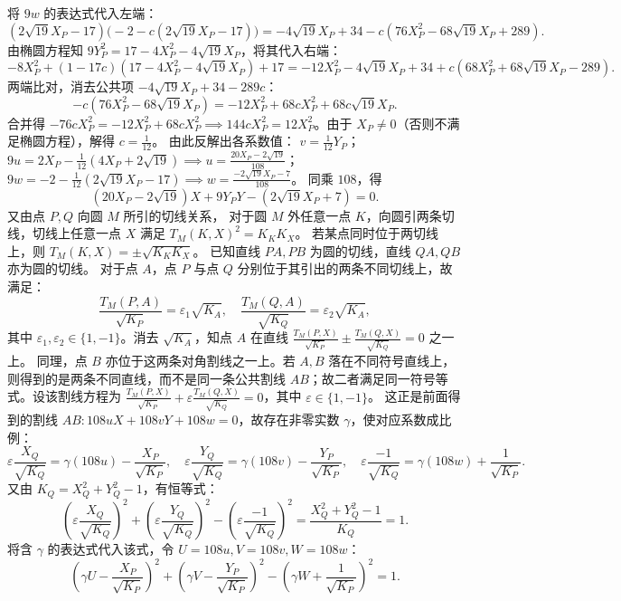 \begin{solution}
将 $9w$ 的表达式代入左端：
\[ (2\sqrt{19} X_P - 17)\big(-2 - c(2\sqrt{19} X_P - 17)\big) = -4\sqrt{19} X_P + 34 - c(76 X_P^2 - 68\sqrt{19} X_P + 289). \]
由椭圆方程知 $9Y_P^2 = 17 - 4X_P^2 - 4\sqrt{19} X_P$，将其代入右端：
\[ -8X_P^2 + (1 - 17c)(17 - 4X_P^2 - 4\sqrt{19} X_P) + 17 = -12X_P^2 - 4\sqrt{19} X_P + 34 + c(68X_P^2 + 68\sqrt{19} X_P - 289). \]
两端比对，消去公共项 $-4\sqrt{19} X_P + 34 - 289c$：
\[ -c(76 X_P^2 - 68\sqrt{19} X_P) = -12X_P^2 + 68c X_P^2 + 68c \sqrt{19} X_P. \]
合并得 $-76c X_P^2 = -12X_P^2 + 68c X_P^2 \implies 144c X_P^2 = 12X_P^2$。由于 $X_P \neq 0$（否则不满足椭圆方程），解得 $c = \frac{1}{12}$。
由此反解出各系数值：
$v = \frac{1}{12} Y_P$；
$9u = 2X_P - \frac{1}{12}(4X_P + 2\sqrt{19}) \implies u = \frac{20X_P - 2\sqrt{19}}{108}$；
$9w = -2 - \frac{1}{12}(2\sqrt{19} X_P - 17) \implies w = \frac{-2\sqrt{19} X_P - 7}{108}$。
同乘 $108$，得
\[ (20X_P - 2\sqrt{19})X + 9Y_P Y - (2\sqrt{19} X_P + 7) = 0. \]
又由点 $P,Q$ 向圆 $M$ 所引的切线关系，
对于圆 $M$ 外任意一点 $K$，向圆引两条切线，切线上任意一点 $X$ 满足 $T_M(K, X)^2 = K_K K_X$。
若某点同时位于两切线上，则 $T_M(K, X) = \pm \sqrt{K_K K_X}$。
已知直线 $PA, PB$ 为圆的切线，直线 $QA, QB$ 亦为圆的切线。
对于点 $A$，点 $P$ 与点 $Q$ 分别位于其引出的两条不同切线上，故满足：
\[ \frac{T_M(P, A)}{\sqrt{K_P}} = \varepsilon_1 \sqrt{K_A}, \quad \frac{T_M(Q, A)}{\sqrt{K_Q}} = \varepsilon_2 \sqrt{K_A}, \]
其中 $\varepsilon_1, \varepsilon_2 \in \{1, -1\}$。消去 $\sqrt{K_A}$，知点 $A$ 在直线 $\frac{T_M(P, X)}{\sqrt{K_P}} \pm \frac{T_M(Q, X)}{\sqrt{K_Q}} = 0$ 之一上。
同理，点 $B$ 亦位于这两条对角割线之一上。若 $A,B$ 落在不同符号直线上，则得到的是两条不同直线，而不是同一条公共割线 $AB$；故二者满足同一符号等式。设该割线方程为 $\frac{T_M(P, X)}{\sqrt{K_P}} + \varepsilon \frac{T_M(Q, X)}{\sqrt{K_Q}} = 0$，其中 $\varepsilon \in \{1, -1\}$。
这正是前面得到的割线 $AB: 108uX + 108vY + 108w = 0$，故存在非零实数 $\gamma$，使对应系数成比例：
\[ \varepsilon \frac{X_Q}{\sqrt{K_Q}} = \gamma (108u) - \frac{X_P}{\sqrt{K_P}}, \quad \varepsilon \frac{Y_Q}{\sqrt{K_Q}} = \gamma (108v) - \frac{Y_P}{\sqrt{K_P}}, \quad \varepsilon \frac{-1}{\sqrt{K_Q}} = \gamma (108w) + \frac{1}{\sqrt{K_P}}. \]
又由 $K_Q = X_Q^2 + Y_Q^2 - 1$，有恒等式：
\[ \left( \varepsilon \frac{X_Q}{\sqrt{K_Q}} \right)^2 + \left( \varepsilon \frac{Y_Q}{\sqrt{K_Q}} \right)^2 - \left( \varepsilon \frac{-1}{\sqrt{K_Q}} \right)^2 = \frac{X_Q^2 + Y_Q^2 - 1}{K_Q} = 1. \]
将含 $\gamma$ 的表达式代入该式，令 $U = 108u, V = 108v, W = 108w$：
\[ \left(\gamma U - \frac{X_P}{\sqrt{K_P}}\right)^2 + \left(\gamma V - \frac{Y_P}{\sqrt{K_P}}\right)^2 - \left(\gamma W + \frac{1}{\sqrt{K_P}}\right)^2 = 1. \]

\end{solution}
